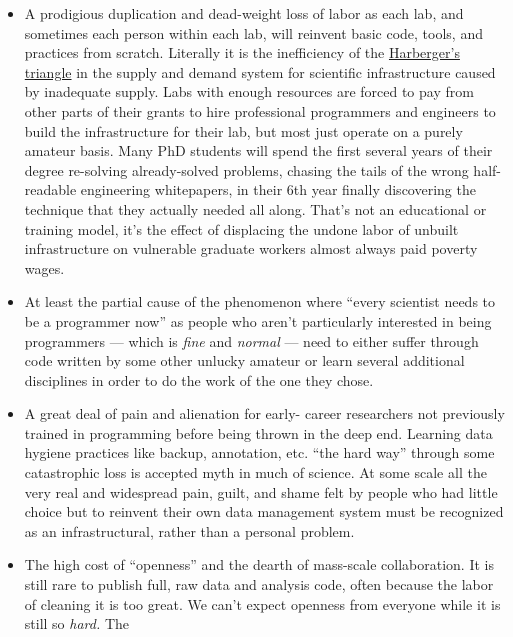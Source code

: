 \begin{itemize}

\item
  A prodigious duplication and dead-weight loss of labor as each lab,
  and sometimes each person within each lab, will reinvent basic code,
  tools, and practices from scratch. Literally it is the inefficiency of
  the
  \href{https://en.wikipedia.org/wiki/Deadweight_loss\#Harberger's_triangle}{Harberger's
  triangle} in the supply and demand system for scientific
  infrastructure caused by inadequate supply. Labs with enough resources
  are forced to pay from other parts of their grants to hire
  professional programmers and engineers to build the infrastructure for
  their lab, but
  most just operate on a purely amateur basis. Many PhD students will
  spend the first several years of their degree re-solving
  already-solved problems, chasing the tails of the wrong half-readable
  engineering whitepapers, in their 6th year finally discovering the
  technique that they actually needed all along. That's not an
  educational or training model, it's the effect of displacing the
  undone labor of unbuilt infrastructure on vulnerable graduate workers
  almost always paid poverty wages.
\item
  At least the partial cause of the phenomenon where ``every scientist
  needs to be a programmer now'' as people who aren't particularly
  interested in being programmers --- which is \emph{fine} and
  \emph{normal} --- need to either suffer through code written by some
  other unlucky amateur or learn several additional disciplines in order
  to do the work of the one they chose.
\item
  A great deal of pain and alienation for early- career researchers not
  previously trained in programming before being thrown in the deep end.
  Learning data hygiene practices like backup, annotation, etc. ``the
  hard way'' through some catastrophic loss is accepted myth in much of
  science. At some scale all the very real and widespread pain, guilt,
  and shame felt by people who had little choice but to reinvent their
  own data management system must be recognized as an infrastructural,
  rather than a personal problem.
\item
  The high cost of ``openness'' and the dearth of mass-scale
  collaboration. It is still rare to publish full, raw data and analysis
  code, often because the labor of cleaning it is too great. We can't
  expect openness from everyone while it is still so \emph{hard.} The

\end{itemize}
